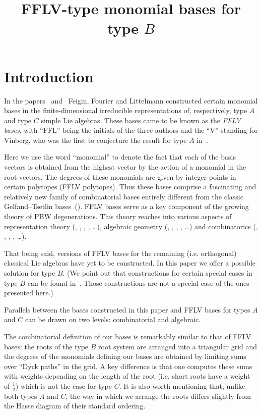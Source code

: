 \documentclass[ALCO,ThmDefs,Unicode]{cedram}
\title{FFLV-type monomial bases for type \texorpdfstring{$B$}{B}}
\author{\firstname{Igor} \lastname{Makhlin}}
\begin{document}
\maketitle

\section*{Introduction}

In the papers~\cite{FFL1} and~\cite{FFL2} Feigin, Fourier and Littelmann constructed certain monomial bases in the finite-dimensional irreducible representations of, respectively, type $A$ and type $C$ simple Lie algebras. These bases came to be known as the \emph{FFLV bases}, with ``FFL'' being the initials of the three authors and the ``V'' standing for Vinberg, who was the first to conjecture the result for type $A$ in~\cite{V}.

Here we use the word ``monomial'' to denote the fact that each of the basis vectors is obtained from the highest vector by the action of a monomial in the root vectors. The degrees of these monomials are given by integer points in certain polytopes (FFLV polytopes). Thus these bases comprise a fascinating and relatively new family of combinatorial bases entirely different from the classic Gelfand--Tsetlin bases~(\cite{Mo}). FFLV bases serve as a key component of the growing theory of PBW degenerations. This theory reaches into various aspects of representation theory (\cite{Fe1}, \cite{FFL1}, \cite{FFL2}, \cite{CF}, \dots), algebraic geometry (\cite{Fe2}, \cite{CFR}, \cite{H}, \cite{Ki}, \dots) and combinatorics (\cite{ABS}, \cite{K}, \cite{Fo}, \cite{FM}, \dots).

That being said, versions of FFLV bases for the remaining (i.e. orthogonal) classical Lie algebras have yet to be constructed. In this paper we offer a possible solution for type $B$. (We point out that constructions for certain special cases in type $B$ can be found in~\cite{BK}. Those constructions are not a special case of the ones presented here.)

Parallels between the bases constructed in this paper and FFLV bases for types $A$ and $C$ can be drawn on two levels: combinatorial and algebraic.

The combinatorial definition of our bases is remarkably similar to that of FFLV bases: the roots of the type $B$ root system are arranged into a triangular grid and the degrees of the monomials defining our bases are obtained by limiting sums over ``Dyck paths'' in the grid. A key difference is that one computes these sums with weights depending on the length of the root (i.e. short roots have a weight of $\frac12$) which is not the case for type $C$. It is also worth mentioning that, unlike both types $A$ and $C$, the way in which we arrange the roots differs slightly from the Hasse diagram of their standard ordering.
\end{document}
